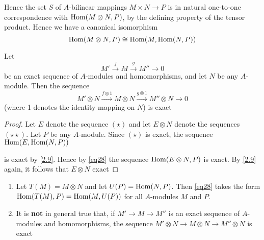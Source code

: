 \documentclass[11pt]{article}
\begin{document}
Hence the set \(S\) of \(A\)-bilinear mappings \(M\times N\to P\) is in natural one-to-one
correspondence with \(\operatorname{Hom}(M\otimes N,P)\), by the defining property of the tensor product. Hence we
have a canonical isomorphism
\begin{equation}
\operatorname{Hom}(M\otimes N,P)\cong\operatorname{Hom}(M,\operatorname{Hom}(N,P))\label{eq28}
\end{equation}

\begin{proposition}[]
\label{2.18}
Let
\begin{equation*}
M'\xrightarrow{f}M\xrightarrow{g}M''\to 0\tag*{(\star)}
\end{equation*}
be an exact sequence of \(A\)-modules and homomorphisms, and let \(N\) be any \(A\)-module. Then
the sequence
\begin{equation*}
M'\otimes N\xrightarrow{f\otimes 1}M\otimes N\xrightarrow{g\otimes 1}M''\otimes N\to 0\tag*{(\star\star)}
\end{equation*}
(where 1 denotes the identity mapping on \(N\)) is exact
\end{proposition}

\begin{proof}
Let \(E\) denote the sequence \((\star)\) and let \(E\otimes N\) denote the sequences \((\star\star)\).
Let \(P\) be any \(A\)-module. Since \((\star)\) is exact, the sequence \(\operatorname{Hom}(E,\operatorname{Hom}(N,P))\)
\begin{center}\end{center}
is exact by \ref{2.9}. Hence by \eqref{eq28} the sequence \(\operatorname{Hom}(E\otimes N,P)\) is exact. By \ref{2.9}
again, it follows that \(E\otimes N\) exact
\end{proof}

\begin{remark}
\begin{enumerate}
\item Let \(T(M)=M\otimes N\) and let \(U(P)=\operatorname{Hom}(N,P)\). Then \eqref{eq28} takes the
form \(\operatorname{Hom}(T(M),P)=\operatorname{Hom}(M,U(P))\) for all \(A\)-modules \(M\) and \(P\).

\label{Problem3}

\item It is \textbf{not} in general true that, if \(M'\to M\to M''\) is an exact sequence of \(A\)-modules and
homomorphisms, the sequence \(M'\otimes N\to M\otimes N\to M''\otimes N\) is exact
\end{enumerate}
\end{remark}
\end{document}
